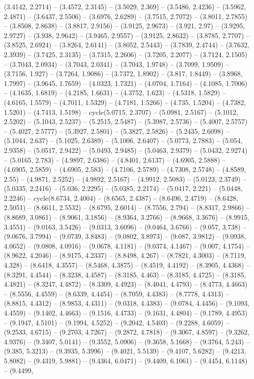 (3.4142, 2.2714) -- (3.4572, 2.3145) -- (3.5029, 2.369) -- (3.5486, 2.4236) -- (3.5962, 2.4871) -- (3.6437, 2.5506) -- (3.6976, 2.6289) -- (3.7515, 2.7072) -- (3.8011, 2.7855) -- (3.8508, 2.8638) -- (3.8817, 2.9156) -- (3.9125, 2.9673) -- (3.921, 2.97) -- (3.9295, 2.9727) -- (3.938, 2.9642) -- (3.9465, 2.9557) -- (3.9125, 2.8632) -- (3.8785, 2.7707) -- (3.8525, 2.6924) -- (3.8264, 2.6141) -- (3.8052, 2.5443) -- (3.7839, 2.4744) -- (3.7632, 2.3939) -- (3.7425, 2.3135) -- (3.7315, 2.2606) -- (3.7205, 2.2077) -- (3.7124, 2.1505) -- (3.7043, 2.0934) -- (3.7043, 2.0341) -- (3.7043, 1.9748) -- (3.7099, 1.9509) -- (3.7156, 1.927) -- (3.7264, 1.9086) -- (3.7372, 1.8902) -- (3.817, 1.8449) -- (3.8968, 1.7997) -- (3.9645, 1.7659) -- (4.0323, 1.7321) -- (4.0704, 1.7164) -- (4.1085, 1.7006) -- (4.1635, 1.6819) -- (4.2185, 1.6631) -- (4.3752, 1.623) -- (4.5318, 1.5829) -- (4.6165, 1.5579) -- (4.7011, 1.5329) -- (4.7181, 1.5266) -- (4.735, 1.5204) -- (4.7382, 1.5201) -- (4.7413, 1.5198) -- cycle(5.0715, 2.3707) -- (5.0981, 2.5167) -- (5.1012, 2.5202) -- (5.1043, 2.5237) -- (5.2515, 2.5487) -- (5.3987, 2.5736) -- (5.4007, 2.5757) -- (5.4027, 2.5777) -- (5.3927, 2.5801) -- (5.3827, 2.5826) -- (5.2435, 2.6098) -- (5.1044, 2.637) -- (5.1025, 2.6389) -- (5.1006, 2.6407) -- (5.0773, 2.7883) -- (5.054, 2.9358) -- (5.0517, 2.9422) -- (5.0493, 2.9485) -- (5.0463, 2.9379) -- (5.0432, 2.9274) -- (5.0165, 2.783) -- (4.9897, 2.6386) -- (4.8401, 2.6137) -- (4.6905, 2.5888) -- (4.6905, 2.5859) -- (4.6905, 2.583) -- (4.7106, 2.5789) -- (4.7308, 2.5748) -- (4.8589, 2.55) -- (4.9871, 2.5252) -- (4.9892, 2.5167) -- (4.9912, 2.5083) -- (5.0123, 2.3749) -- (5.0335, 2.2416) -- (5.036, 2.2295) -- (5.0385, 2.2174) -- (5.0417, 2.221) -- (5.0448, 2.2246) -- cycle(8.6734, 2.4004) -- (8.6565, 2.4387) -- (8.6496, 2.4719) -- (8.6428, 2.5051) -- (8.6611, 2.5532) -- (8.6795, 2.6014) -- (8.7556, 2.794) -- (8.8317, 2.9866) -- (8.8689, 3.0861) -- (8.9061, 3.1856) -- (8.9364, 3.2766) -- (8.9668, 3.3676) -- (8.9915, 3.4551) -- (9.0163, 3.5426) -- (9.0313, 3.6096) -- (9.0464, 3.6766) -- (9.057, 3.738) -- (9.0676, 3.7994) -- (9.0739, 3.8483) -- (9.0802, 3.8973) -- (9.087, 3.9812) -- (9.0938, 4.0652) -- (9.0808, 4.0916) -- (9.0678, 4.1181) -- (9.0374, 4.1467) -- (9.007, 4.1754) -- (8.9622, 4.2046) -- (8.9175, 4.2337) -- (8.8498, 4.267) -- (8.7821, 4.3003) -- (8.7119, 4.328) -- (8.6418, 4.3557) -- (8.5468, 4.3875) -- (8.4519, 4.4192) -- (8.3905, 4.4368) -- (8.3291, 4.4544) -- (8.3238, 4.4587) -- (8.3185, 4.463) -- (8.3185, 4.4725) -- (8.3185, 4.4821) -- (8.3247, 4.4872) -- (8.3309, 4.4923) -- (8.4041, 4.4793) -- (8.4773, 4.4663) -- (8.5556, 4.4559) -- (8.6339, 4.4454) -- (8.7059, 4.4383) -- (8.7778, 4.4313) -- (8.8815, 4.4312) -- (8.9853, 4.4311) -- (9.0318, 4.4383) -- (9.0784, 4.4456) -- (9.1093, 4.4559) -- (9.1402, 4.4663) -- (9.1516, 4.4733) -- (9.1631, 4.4804) -- (9.1789, 4.4953) -- (9.1947, 4.5101) -- (9.1994, 4.5252) -- (9.2042, 4.5403) -- (9.2288, 4.6059) -- (9.2533, 4.6715) -- (9.2703, 4.7267) -- (9.2872, 4.7818) -- (9.3067, 4.8597) -- (9.3262, 4.9376) -- (9.3407, 5.0141) -- (9.3552, 5.0906) -- (9.3658, 5.1668) -- (9.3764, 5.243) -- (9.385, 5.3213) -- (9.3935, 5.3996) -- (9.4021, 5.5139) -- (9.4107, 5.6282) -- (9.4213, 5.8082) -- (9.4319, 5.9881) -- (9.4364, 6.0471) -- (9.4409, 6.1061) -- (9.4454, 6.1148) -- (9.4499, 